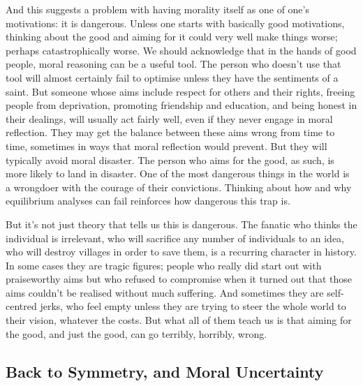 \documentclass[
  10pt,
  letterpaper,
  twoside]{scrbook}
\begin{document}
And this suggests a problem with having morality itself as one of one's
motivations: it is dangerous. Unless one starts with basically good
motivations, thinking about the good and aiming for it could very well
make things worse; perhaps catastrophically worse. We should acknowledge
that in the hands of good people, moral reasoning can be a useful tool.
The person who doesn't use that tool will almost certainly fail to
optimise unless they have the sentiments of a saint. But someone whose
aims include respect for others and their rights, freeing people from
deprivation, promoting friendship and education, and being honest in
their dealings, will usually act fairly well, even if they never engage
in moral reflection. They may get the balance between these aims wrong
from time to time, sometimes in ways that moral reflection would
prevent. But they will typically avoid moral disaster. The person who
aims for the good, as such, is more likely to land in disaster. One of
the most dangerous things in the world is a wrongdoer with the courage
of their convictions. Thinking about how and why equilibrium analyses
can fail reinforces how dangerous this trap is.

But it's not just theory that tells us this is dangerous. The fanatic
who thinks the individual is irrelevant, who will sacrifice any number
of individuals to an idea, who will destroy villages in order to save
them, is a recurring character in history. In some cases they are tragic
figures; people who really did start out with praiseworthy aims but who
refused to compromise when it turned out that those aims couldn't be
realised without much suffering. And sometimes they are self-centred
jerks, who feel empty unless they are trying to steer the whole world to
their vision, whatever the costs. But what all of them teach us is that
aiming for the good, and just the good, can go terribly, horribly,
wrong.

\subsection{Back to Symmetry, and Moral
Uncertainty}\label{backtosymmetryandmoraluncertainty}
\end{document}
